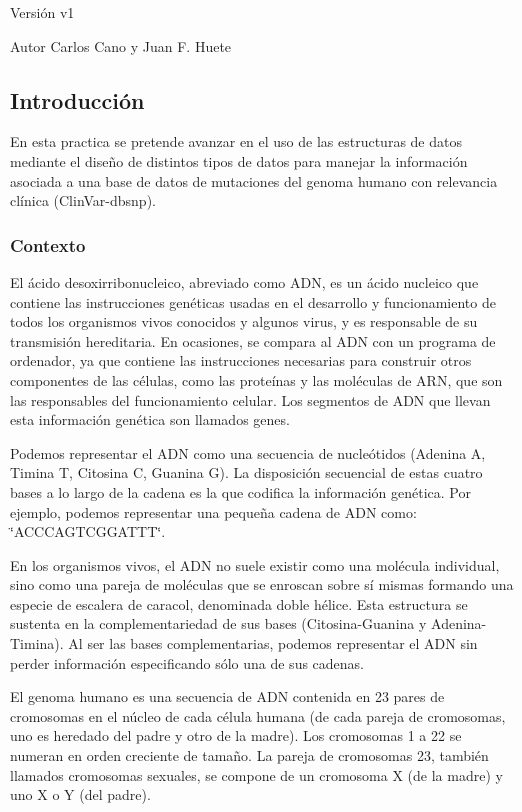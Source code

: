 \begin{DoxyVersion}{Versión}
v1 
\end{DoxyVersion}
\begin{DoxyAuthor}{Autor}
Carlos Cano y Juan F. Huete
\end{DoxyAuthor}
\hypertarget{index_introsec}{}\subsection{Introducción}\label{index_introsec}
En esta practica se pretende avanzar en el uso de las estructuras de datos mediante el diseño de distintos tipos de datos para manejar la información asociada a una base de datos de mutaciones del genoma humano con relevancia clínica (Clin\+Var-\/dbsnp).\hypertarget{index_background}{}\subsubsection{Contexto}\label{index_background}
El ácido desoxirribonucleico, abreviado como A\+DN, es un ácido nucleico que contiene las instrucciones genéticas usadas en el desarrollo y funcionamiento de todos los organismos vivos conocidos y algunos virus, y es responsable de su transmisión hereditaria. En ocasiones, se compara al A\+DN con un programa de ordenador, ya que contiene las instrucciones necesarias para construir otros componentes de las células, como las proteínas y las moléculas de A\+RN, que son las responsables del funcionamiento celular. Los segmentos de A\+DN que llevan esta información genética son llamados genes.

Podemos representar el A\+DN como una secuencia de nucleótidos (Adenina A, Timina T, Citosina C, Guanina G). La disposición secuencial de estas cuatro bases a lo largo de la cadena es la que codifica la información genética. Por ejemplo, podemos representar una pequeña cadena de A\+DN como\+: \char`\"{}\+A\+C\+C\+C\+A\+G\+T\+C\+G\+G\+A\+T\+T\+T\char`\"{}.

En los organismos vivos, el A\+DN no suele existir como una molécula individual, sino como una pareja de moléculas que se enroscan sobre sí mismas formando una especie de escalera de caracol, denominada doble hélice. Esta estructura se sustenta en la complementariedad de sus bases (Citosina-\/\+Guanina y Adenina-\/\+Timina). Al ser las bases complementarias, podemos representar el A\+DN sin perder información especificando sólo una de sus cadenas.

El genoma humano es una secuencia de A\+DN contenida en 23 pares de cromosomas en el núcleo de cada célula humana (de cada pareja de cromosomas, uno es heredado del padre y otro de la madre). Los cromosomas 1 a 22 se numeran en orden creciente de tamaño. La pareja de cromosomas 23, también llamados cromosomas sexuales, se compone de un cromosoma X (de la madre) y uno X o Y (del padre).

